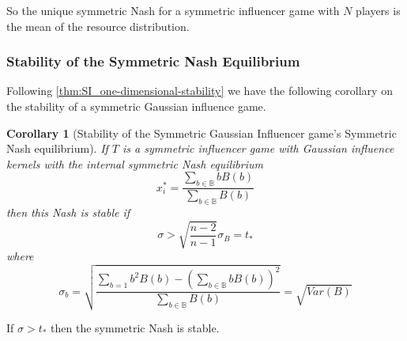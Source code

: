 \documentclass{article}
\newtheorem{corollary}{Corollary}[theorem]
\newcommand {\B}{\mathbb{B}}
\begin{document}
            So the unique symmetric Nash for a symmetric influencer game with $N$ players is the mean of the resource distribution.  
            \subsubsection{Stability of the Symmetric Nash Equilibrium}
            Following \cref{thm:SI_one-dimensional-stability} we have the following corollary on the stability of a symmetric Gaussian influence game. 
            \begin{corollary}[Stability of the Symmetric Gaussian Influencer game's Symmetric Nash equilibrium]
                If $T$ is a symmetric influencer game with Gaussian influence kernels with the internal symmetric Nash equilibrium
                \begin{equation}
                    x^*_i=\frac{\sum_{b\in \B} bB(b)}{\sum_{b\in \B}B(b)}
                \end{equation}
                then this Nash is stable if 
                \begin{equation}
                    \sigma > \sqrt{\frac{n-2}{n-1}} \sigma_B=t_*
                \end{equation}
                where 
                \begin{equation}
                    \sigma_b=\sqrt{\frac{\sum_{b=1}b^2B(b)-(\sum_{b\in\B}bB(b))^2}{\sum_{b\in\B}B(b)}}=\sqrt{Var(B)}
                \end{equation}
            \end{corollary}
            If $\sigma>t_*$ then the symmetric Nash is stable. 
\end{document}
